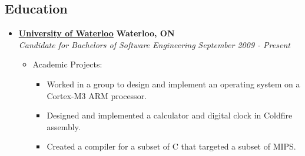 \documentclass[10pt,letterpaper]{article}
\begin{document}
\subsection*{Education}
  \begin{itemize}
    \parskip=-0.1em

    \item[]
    {\href{http://www.uwaterloo.ca}{\textbf{University of Waterloo}} \hfill
      \textbf{Waterloo, ON}}
    \\
    {\emph{Candidate for Bachelors of Software Engineering} \hfill
      \emph{September 2009 - Present}}

    \begin{itemize}[label=\textbullet]
      \item Academic Projects:
      \begin{itemize}
        \itemsep0em
        \item Worked in a group to design and implement an operating system on
              a Cortex-M3 ARM processor.
        \item Designed and implemented a calculator and digital clock in Coldfire
              assembly.
        \item Created a compiler for a subset of C that targeted a subset of
              MIPS.
      \end{itemize}
    \end{itemize}
  \end{itemize}
\end{document}
